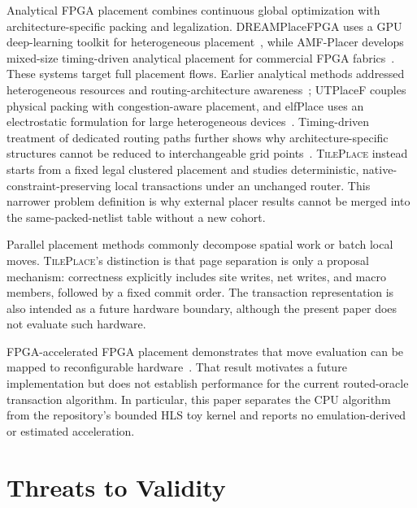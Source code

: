 \documentclass[sigconf,anonymous,review]{acmart}
\newcommand{\system}{\textsc{TilePlace}}
\begin{document}
Analytical FPGA placement combines continuous global optimization with
architecture-specific packing and legalization.  DREAMPlaceFPGA uses a GPU
deep-learning toolkit for heterogeneous placement~\cite{rajarathnam2022dreamplacefpga},
while AMF-Placer develops mixed-size timing-driven analytical placement for
commercial FPGA fabrics~\cite{liang2024amf}.  These systems target full
placement flows.  Earlier analytical methods addressed heterogeneous
resources and routing-architecture awareness~\cite{gort2012analytical,chen2015routingaware};
UTPlaceF couples physical packing with congestion-aware placement, and
elfPlace uses an electrostatic formulation for large heterogeneous
devices~\cite{li2018utplacef,li2019elfplace}.  Timing-driven treatment of
dedicated routing paths further shows why architecture-specific structures
cannot be reduced to interchangeable grid points~\cite{nikolic2020dedicated}.
\system{} instead starts from a fixed legal clustered
placement and studies deterministic, native-constraint-preserving local
transactions under an unchanged router.  This narrower problem definition is
why external placer results cannot be merged into the same-packed-netlist
table without a new cohort.

Parallel placement methods commonly decompose spatial work or batch local
moves.  \system{}'s distinction is that page separation is only a proposal
mechanism: correctness explicitly includes site writes, net writes, and macro
members, followed by a fixed commit order.  The transaction representation is
also intended as a future hardware boundary, although the present paper does
not evaluate such hardware.

FPGA-accelerated FPGA placement demonstrates that move evaluation can be
mapped to reconfigurable hardware~\cite{dhar2019accelerated}.  That result
motivates a future implementation but does not establish performance for the
current routed-oracle transaction algorithm.  In particular, this paper separates the
CPU algorithm from the repository's bounded HLS toy kernel and reports no
emulation-derived or estimated acceleration.

\section{Threats to Validity}
\end{document}
